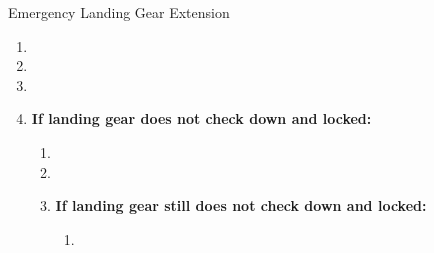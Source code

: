 \begin{checklist_emerg}{Emergency Landing Gear Extension}
    \begin{enumerate}
        \item {}
        \item {}
        \item {}
        \item{
            \textbf{If landing gear does not check down and locked:}
            \begin{enumerate}
                \item {}
                \item {}
                \item \textbf{If landing gear still does not check down and locked:}
                \begin{enumerate}
                    \item {}
                \end{enumerate}
            \end{enumerate}
        }

    \end{enumerate}
\end{checklist_emerg}
